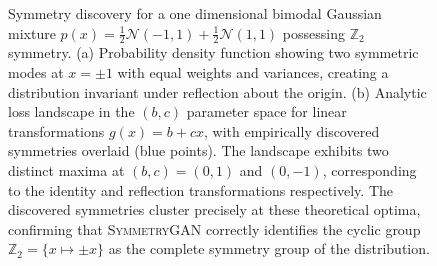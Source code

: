 \begin{figure}
\begin{subfigure}[b]{0.4\textwidth}
        \caption{}
        \label{fig:otherdistributions_1Dii}
    \end{subfigure}
    \caption[\textsc{SymmetryGAN}'s predictions for a bimodal Gaussian mixture with $\mathbb{Z}_2$ reflection symmetry and corresponding loss landscape validation.]{Symmetry discovery for a one dimensional bimodal Gaussian mixture $p(x) = \frac{1}{2}\mathcal{N}(-1, 1) + \frac{1}{2}\mathcal{N}(1, 1)$ possessing $\mathbb{Z}_2$ symmetry. (a) Probability density function showing two symmetric modes at $x = \pm 1$ with equal weights and variances, creating a distribution invariant under reflection about the origin. (b) Analytic loss landscape in the $(b, c)$ parameter space for linear transformations $g(x) = b + cx$, with empirically discovered symmetries overlaid (blue points). The landscape exhibits two distinct maxima at $(b, c) = (0, 1)$ and $(0, -1)$, corresponding to the identity and reflection transformations respectively. The discovered symmetries cluster precisely at these theoretical optima, confirming that \textsc{SymmetryGAN} correctly identifies the cyclic group $\mathbb{Z}_2 = \{x \mapsto \pm x\}$ as the complete symmetry group of the distribution.}
    \label{fig:otherdistributions-1D}
\end{figure}
